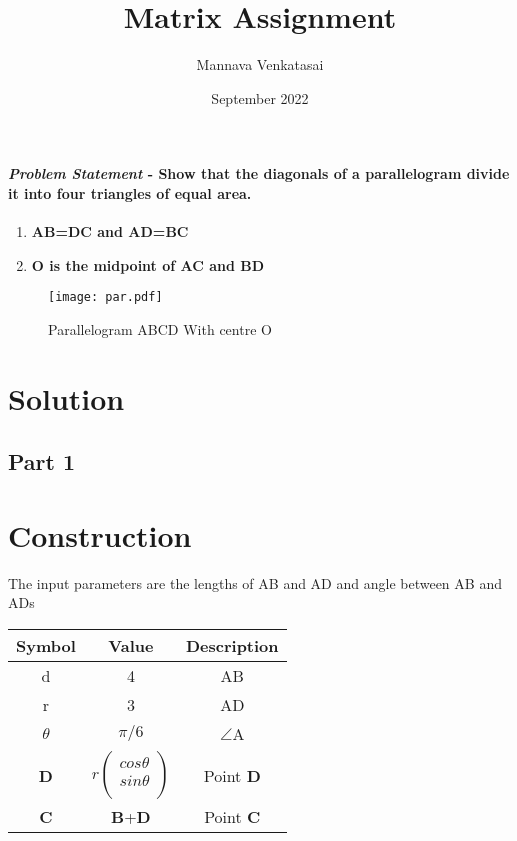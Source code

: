 \documentclass[journal,10pt,twocolumn]{article}
\title{\textbf{Matrix Assignment}}
\author{Mannava Venkatasai}
\date{September 2022}
\begin{document}
\maketitle
\paragraph{\textit{Problem Statement} - Show that the diagonals of a parallelogram divide
it into four triangles of equal area.}
\begin{enumerate}
	\item \textbf{AB=DC and AD=BC}
	\item \textbf{O is the midpoint of AC and BD}
\end{enumerate}
\begin{figure}[h]
\centering
\texttt{[image: par.pdf]}
\caption{Parallelogram ABCD With centre O}
\label{fig:Parallelogram}
\end{figure}

\section*{Solution}
\subsection*{Part 1}
\section*{Construction}
The input parameters are the lengths of AB and AD and angle between AB and ADs \vspace{2mm}\\
{
\setlength\extrarowheight{2pt}
\begin{tabular}{|c|c|c|}
	\hline
	\textbf{Symbol}&\textbf{Value}&\textbf{Description}\\
	\hline
	d&4&AB\\
	\hline
	r&3&AD\\
	\hline
	$\theta$&$\pi/6$&$\angle$A\\
	\hline
	\textbf{D}&$r%
	\begin{pmatrix}
		cos\theta\\
		sin\theta\\
	\end{pmatrix}$%
	&Point \textbf{D}\\
	\hline
	\textbf{C}&\textbf{B}+\textbf{D}
	&Point \textbf{C}\\
	\hline
\end{tabular}
}
\end{document}
